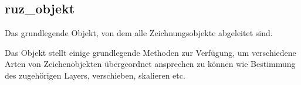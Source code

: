 \subsection{ruz\_objekt}
Das grundlegende Objekt, von dem alle Zeichnungsobjekte abgeleitet sind.

Das Objekt stellt einige grundlegende Methoden zur Verfügung, um verschiedene Arten von Zeichenobjekten übergeordnet ansprechen zu können wie Bestimmung des zugehörigen Layers, verschieben, skalieren etc.